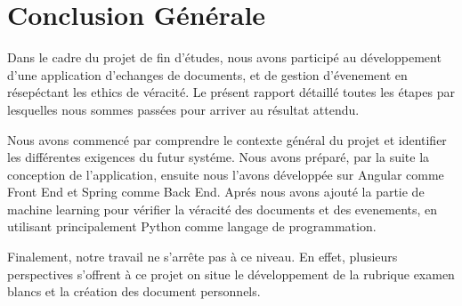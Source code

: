 \documentclass[12pt]{report}
\begin{document}
\chapter*{Conclusion Générale}
Dans le cadre du projet de fin d’études, nous avons participé au développement d’une
application d'echanges de documents, et de gestion d'évenement en résepéctant les ethics de véracité.
Le présent rapport détaillé toutes les étapes par lesquelles nous sommes passées pour
arriver au résultat attendu.

Nous avons commencé par comprendre le contexte général du projet et identifier les différentes exigences du futur systéme. Nous avons préparé, par la suite la conception de l'application, ensuite nous l'avons développée sur Angular comme Front End et Spring comme Back End. Aprés nous avons ajouté la partie de machine learning pour vérifier la véracité des documents et des evenements, en utilisant principalement Python comme langage de programmation.

Finalement, notre travail ne s’arrête pas à ce niveau. En effet, plusieurs perspectives
s’offrent à ce projet on situe le développement de la rubrique examen blancs et la création des document personnels.
\end{document}

